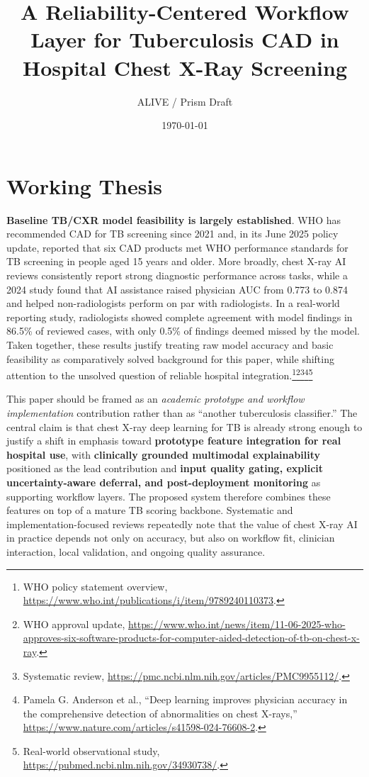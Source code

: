 \documentclass[11pt]{article}
\title{A Reliability-Centered Workflow Layer for Tuberculosis CAD in Hospital Chest X-Ray Screening}
\author{ALIVE / Prism Draft}
\date{\today}
\begin{document}
\maketitle

\section{Working Thesis}

\textbf{Baseline TB/CXR model feasibility is largely established}. WHO has recommended CAD for TB screening since 2021 and, in its June 2025 policy update, reported that six CAD products met WHO performance standards for TB screening in people aged 15 years and older. More broadly, chest X-ray AI reviews consistently report strong diagnostic performance across tasks, while a 2024 study found that AI assistance raised physician AUC from 0.773 to 0.874 and helped non-radiologists perform on par with radiologists. In a real-world reporting study, radiologists showed complete agreement with model findings in 86.5\% of reviewed cases, with only 0.5\% of findings deemed missed by the model. Taken together, these results justify treating raw model accuracy and basic feasibility as comparatively solved background for this paper, while shifting attention to the unsolved question of reliable hospital integration.\footnote{WHO policy statement overview, \url{https://www.who.int/publications/i/item/9789240110373}.}\footnote{WHO approval update, \url{https://www.who.int/news/item/11-06-2025-who-approves-six-software-products-for-computer-aided-detection-of-tb-on-chest-x-ray}.}\footnote{Systematic review, \url{https://pmc.ncbi.nlm.nih.gov/articles/PMC9955112/}.}\footnote{Pamela G. Anderson et al., ``Deep learning improves physician accuracy in the comprehensive detection of abnormalities on chest X-rays,'' \url{https://www.nature.com/articles/s41598-024-76608-2}.}\footnote{Real-world observational study, \url{https://pubmed.ncbi.nlm.nih.gov/34930738/}.}


This paper should be framed as an \emph{academic prototype and workflow implementation} contribution rather than as ``another tuberculosis classifier.'' The central claim is that chest X-ray deep learning for TB is already strong enough to justify a shift in emphasis toward \textbf{prototype feature integration for real hospital use}, with \textbf{clinically grounded multimodal explainability} positioned as the lead contribution and \textbf{input quality gating, explicit uncertainty-aware deferral, and post-deployment monitoring} as supporting workflow layers. The proposed system therefore combines these features on top of a mature TB scoring backbone. Systematic and implementation-focused reviews repeatedly note that the value of chest X-ray AI in practice depends not only on accuracy, but also on workflow fit, clinician interaction, local validation, and ongoing quality assurance.
\end{document}
